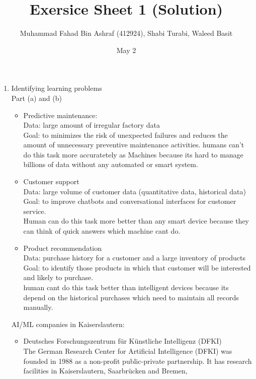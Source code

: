 \documentclass[12pt, a4paper]{article}
\title{Exersice Sheet 1 (Solution)}
\author{Muhammad Fahad Bin Ashraf (412924), Shabi Turabi, Waleed Basit}
\date{May 2}
\begin{document}
 
\begin{titlepage}
\maketitle
\end{titlepage}

\begin{enumerate}
    \item Identifying learning problems \\
    Part (a) and (b)
    \begin{itemize}
        \item Predictive maintenance:\\
        Data: large amount of irregular factory data \\
        Goal: to minimizes the risk of unexpected failures and reduces the amount of unnecessary preventive maintenance activities.
        humans can't do this task more accuratetely as Machines because its hard to manage billions of data without any automated or smart system.
        \item Customer support \\
        Data: large volume of customer data  (quantitative data, historical data) \\
        Goal: to improve chatbots and conversational interfaces for customer service.\\
        Human can do this task more better than any smart device because they can think of quick answers which machine cant do.
        \item Product recommendation \\
        Data: purchase history for a customer and a large inventory of products\\
        Goal: to identify those products in which that customer will be interested and likely to purchase.\\
        human cant do this task better than intelligent devices because its depend on the historical purchases which need to maintain all records manually.
    \end{itemize}
    AI/ML companies in Kaiserslautern:
    \begin{itemize}
        \item Deutsches Forschungszentrum für Künstliche Intelligenz (DFKI) \\
        The German Research Center for Artificial Intelligence (DFKI) was founded in 1988 as a non-profit public-private partnership. 
        It has research facilities in Kaiserslautern, Saarbrücken and Bremen, 

\end{itemize}
\end{enumerate}
\end{document}
